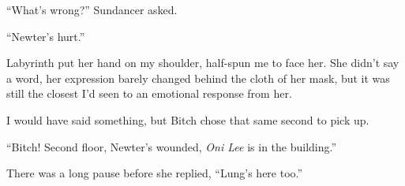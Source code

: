 ``What's wrong?'' Sundancer asked.



``Newter's hurt.''



Labyrinth put her hand on my shoulder, half-spun me to face her.  She didn't say a word, her expression barely changed behind the cloth of her mask, but it was still the closest I'd seen to an emotional response from her.



I would have said something, but Bitch chose that same second to pick up.



``Bitch!  Second floor, Newter's wounded, \emph{Oni Lee} is in the building.''



There was a long pause before she replied, ``Lung's here too.''









